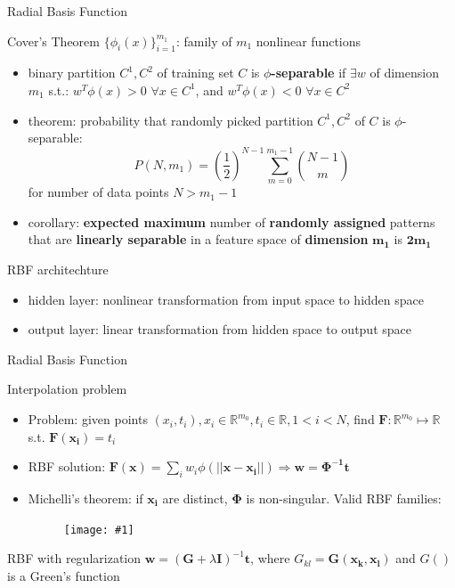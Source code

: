 \documentclass[9pt,t]{beamer}
\newcommand{\picEqHereWidth}[2] { %
    \begin{figure}[htp] 
        \centering
        \texttt{[image: \#1]}
    \end{figure}
}
\begin{document}
\begin{frame}{Radial Basis Function}
    \begin{alertblock}{Cover's Theorem}
        $ \{ \phi_i(x) \}_{i=1}^{m_1} $: family of $ m_1 $ nonlinear functions
        \begin{itemize}
            \item binary partition $ C^1, C^2 $ of training set $ C $ is \textbf{$ \phi $-separable} if $ \exists w $ of dimension $ m_1 $ s.t.: $ w^T \phi(x) > 0$ $\forall x \in C^1 $, and $ w^T \phi(x) < 0$ $\forall x \in C^2 $
            \item theorem: probability that randomly picked partition $ C^1, C^2 $ of $ C $ is $ \phi $-separable:
            \[ P(N, m_1) = \left(\frac{1}{2}\right)^{N-1}\sum_{m=0}^{m_1-1}\binom{N-1}{m} \]
            for number of data points $ N > m_1 - 1 $
            \item corollary: \textbf{expected maximum} number of \textbf{randomly assigned} patterns that are \textbf{linearly separable} in a feature space of \textbf{dimension} $ \mathbf{m_1} $ is $ \mathbf{2 m_1} $
        \end{itemize}
    \end{alertblock}
    \begin{alertblock}{RBF architechture}
        \begin{itemize}
            \item hidden layer: nonlinear transformation from input space to hidden space
            \item output layer: linear transformation from hidden space to output space
        \end{itemize}
    \end{alertblock}
\end{frame}

\begin{frame}{Radial Basis Function}
    \begin{alertblock}{Interpolation problem}
        \begin{itemize}
            \item Problem: given points $ (x_i, t_i) , x_i \in \mathbb{R}^{m_0}, t_i \in \mathbb{R}, 1<i<N $, find $ \mathbf{F}: \mathbb{R}^{m_0} \mapsto \mathbb{R} $ s.t. $ \mathbf{F(x_i)} = t_i $
            \item RBF solution: $ \mathbf{F(x)} = \sum_{i}w_i\phi(||\mathbf{x}-\mathbf{x_i}||) \Rightarrow \mathbf{w} = \mathbf{\Phi^{-1}t} $
            \item Michelli's theorem: if $ \mathbf{x_i} $ are distinct, $ \mathbf{\Phi} $ is non-singular. Valid RBF families:
            \picEqHereWidth{rbf_valid_func}{0.7\linewidth}
        \end{itemize}
    \end{alertblock}
    \begin{alertblock}{RBF with regularization}
        $ \mathbf{w} = (\mathbf{G} + \lambda \mathbf{I})^{-1} \mathbf{t} $, where $ G_{kl} = \mathbf{G(x_k, x_l)} $ and $ G() $ is a Green's function
    \end{alertblock}
\end{frame}
\end{document}
